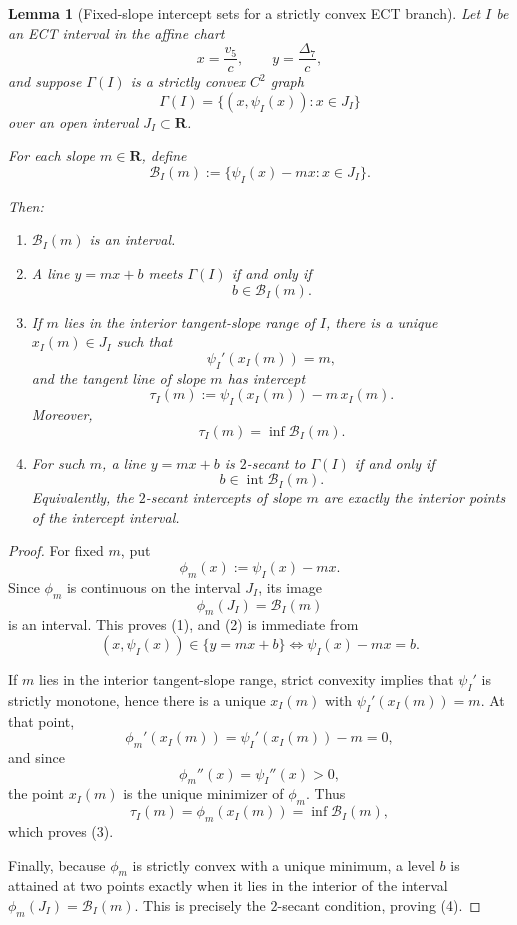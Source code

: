 \documentclass[11pt,a4paper]{amsart}
\theoremstyle{plain}
\newtheorem{lemma}[theorem]{Lemma}
\theoremstyle{definition}
\begin{document}
\begin{lemma}[Fixed-slope intercept sets for a strictly convex ECT branch]
\label{lem:fixed-slope-intercept-sets}
Let $I$ be an ECT interval in the affine chart
\[
x=\frac{v_5}{c},
\qquad
y=\frac{\Delta_7}{c},
\]
and suppose $\Gamma(I)$ is a strictly convex $C^2$ graph
\[
\Gamma(I)=\{(x,\psi_I(x)):x\in J_I\}
\]
over an open interval $J_I\subset\mathbf R$.

For each slope $m\in\mathbf R$, define
\[
\mathcal B_I(m):=\{\psi_I(x)-mx:x\in J_I\}.
\]

Then:

\begin{enumerate}
\item $\mathcal B_I(m)$ is an interval.

\item A line $y=mx+b$ meets $\Gamma(I)$ if and only if
\[
b\in \mathcal B_I(m).
\]

\item If $m$ lies in the interior tangent-slope range of $I$, there is a
unique $x_I(m)\in J_I$ such that
\[
\psi_I'(x_I(m))=m,
\]
and the tangent line of slope $m$ has intercept
\[
\tau_I(m):=\psi_I(x_I(m))-m\,x_I(m).
\]
Moreover,
\[
\tau_I(m)=\inf \mathcal B_I(m).
\]

\item For such $m$, a line $y=mx+b$ is $2$-secant to $\Gamma(I)$ if and
only if
\[
b\in \operatorname{int}\mathcal B_I(m).
\]
Equivalently, the $2$-secant intercepts of slope $m$ are exactly the
interior points of the intercept interval.
\end{enumerate}
\end{lemma}

\begin{proof}
For fixed $m$, put
\[
\phi_m(x):=\psi_I(x)-mx.
\]
Since $\phi_m$ is continuous on the interval $J_I$, its image
\[
\phi_m(J_I)=\mathcal B_I(m)
\]
is an interval. This proves (1), and (2) is immediate from
\[
(x,\psi_I(x))\in \{y=mx+b\}
\iff
\psi_I(x)-mx=b.
\]

If $m$ lies in the interior tangent-slope range, strict convexity implies
that $\psi_I'$ is strictly monotone, hence there is a unique $x_I(m)$
with $\psi_I'(x_I(m))=m$. At that point,
\[
\phi_m'(x_I(m))=\psi_I'(x_I(m))-m=0,
\]
and since
\[
\phi_m''(x)=\psi_I''(x)>0,
\]
the point $x_I(m)$ is the unique minimizer of $\phi_m$. Thus
\[
\tau_I(m)=\phi_m(x_I(m))=\inf \mathcal B_I(m),
\]
which proves (3).

Finally, because $\phi_m$ is strictly convex with a unique minimum,
a level $b$ is attained at two points exactly when it lies in the interior
of the interval $\phi_m(J_I)=\mathcal B_I(m)$. This is precisely the
$2$-secant condition, proving (4).
\end{proof}
\end{document}
